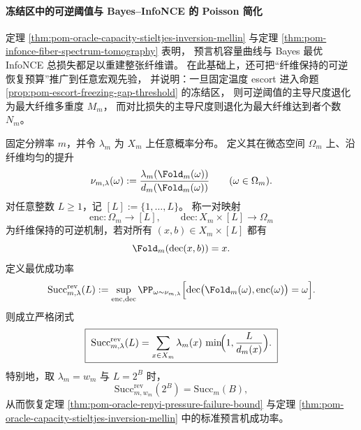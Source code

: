 \paragraph{冻结区中的可逆阈值与 Bayes--InfoNCE 的 Poisson 简化}
定理 \ref{thm:pom-oracle-capacity-stieltjes-inversion-mellin} 与定理 \ref{thm:pom-infonce-fiber-spectrum-tomography} 表明，
预言机容量曲线与 Bayes 最优 InfoNCE 总损失都足以重建整张纤维谱。
在此基础上，还可把“纤维保持的可逆恢复预算”推广到任意宏观先验，
并说明：一旦固定温度 escort 进入命题 \ref{prop:pom-escort-freezing-gap-threshold} 的冻结区，
则可逆阈值的主导尺度退化为最大纤维多重度 \(M_m\)，
而对比损失的主导尺度则退化为最大纤维达到者个数 \(N_m\)。

\begin{theorem}[任意宏观先验下的最优纤维保持可逆容量闭式]\label{thm:pom-macroprior-fiberwise-reversible-capacity}
固定分辨率 \(m\)，并令 \(\lambda_m\) 为 \(X_m\) 上任意概率分布。
定义其在微态空间 \(\Omega_m\) 上、沿纤维均匀的提升
\[
\nu_{m,\lambda}(\omega)
:=
\frac{\lambda_m(\Fold_m(\omega))}{d_m(\Fold_m(\omega))}
\qquad(\omega\in\Omega_m).
\]
对任意整数 \(L\ge 1\)，记 \([L]:=\{1,\dots,L\}\)。
称一对映射
\[
\mathrm{enc}:\Omega_m\to [L],
\qquad
\mathrm{dec}:X_m\times [L]\to \Omega_m
\]
为纤维保持的可逆机制，若对所有 \((x,b)\in X_m\times [L]\) 都有
\[
\Fold_m(\mathrm{dec}(x,b))=x.
\]
定义最优成功率
\[
\mathrm{Succ}^{\mathrm{rev}}_{m,\lambda}(L)
:=
\sup_{\mathrm{enc},\mathrm{dec}}
\PP_{\omega\sim \nu_{m,\lambda}}
\Bigl[
\mathrm{dec}\bigl(\Fold_m(\omega),\mathrm{enc}(\omega)\bigr)=\omega
\Bigr].
\]
则成立严格闭式
\[
\boxed{\;
\mathrm{Succ}^{\mathrm{rev}}_{m,\lambda}(L)
=
\sum_{x\in X_m}\lambda_m(x)\,
\min\!\Bigl(1,\frac{L}{d_m(x)}\Bigr).
\;}
\]
特别地，取 \(\lambda_m=w_m\) 与 \(L=2^B\) 时，
\[
\mathrm{Succ}^{\mathrm{rev}}_{m,w_m}(2^B)=\mathrm{Succ}_m(B),
\]
从而恢复定理 \ref{thm:pom-oracle-renyi-pressure-failure-bound} 与定理 \ref{thm:pom-oracle-capacity-stieltjes-inversion-mellin} 中的标准预言机成功率。
\end{theorem}
